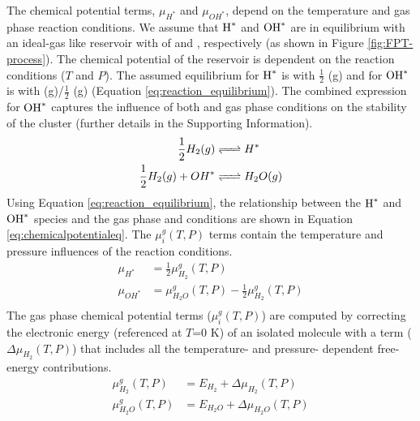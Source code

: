 \documentclass[journal=jctcce,manuscript=article]{achemso}
\begin{document}
The chemical potential terms,  $\mu_{H^{*}}$ and $\mu_{OH^{*}}$, depend on the temperature and gas phase reaction conditions. We assume that $\ce{H^{*}}$ and $\ce{OH^{*}}$ are in equilibrium with an ideal-gas like reservoir with of  and , respectively (as shown in Figure \ref{fig:FPT-process}). The chemical potential of the reservoir is dependent on the reaction conditions ($T$ and $P$). The assumed equilibrium for $\ce{H^{*}}$ is with $\frac{1}{2}$  (g) and for $\ce{OH^{*}}$ is with  (g)/$\frac{1}{2}$ (g) (Equation \ref{eq:reaction_equilibrium}). The combined expression for $\ce{OH^{*}}$ captures the influence of both  and  gas phase conditions on the stability of the cluster (further details in the Supporting Information).
\begin{equation}
    \begin{split}
        \frac{1}{2} H_{2} (g) & \ce{<=>} H^{*} \\           
        \frac{1}{2} H_{2} (g) + OH^{*} & \ce{<=>} H_{2}O (g)  
    \end{split}
    \label{eq:reaction_equilibrium}
\end{equation}
Using Equation \ref{eq:reaction_equilibrium}, the relationship between the $\ce{H^{*}}$ and $\ce{OH^{*}}$ species and the gas phase  and  conditions are shown in Equation \ref{eq:chemicalpotentialeq}. The $\mu_{i}^{g}(T,P)$ terms contain the temperature and pressure influences of the reaction conditions. 
\begin{equation}
    \begin{split}
        \mu_{H^{*}} &= \frac{1}{2} \mu_{H_{2}}^{g}(T,P) \\ 
        \mu_{OH^{*}} &= \mu_{H_{2}O}^{g}(T,P) - \frac{1}{2} \mu_{H_{2}}^{g}(T,P) \\
    \end{split}
    \label{eq:chemicalpotentialeq}
\end{equation}
 The gas phase chemical potential terms ($\mu_{i}^{g}(T,P)$) are computed by correcting the electronic energy (referenced at $T$=0 K) of an isolated molecule with a term ($\Delta \mu_{H_{2}}(T,P)$) that includes all the temperature- and pressure- dependent free-energy contributions. 
\begin{equation}
    \begin{split}
        \mu_{H_{2}}^{g}(T,P) &= E_{H_2} + \Delta \mu_{H_{2}}(T,P)  \\  
        \mu_{H_{2}O}^{g}(T,P) &= E_{H_{2}O} + \Delta \mu_{H_{2}O}(T,P) 
    \end{split}
    \label{eq:chemicalpotentialrel}
\end{equation}
\end{document}
